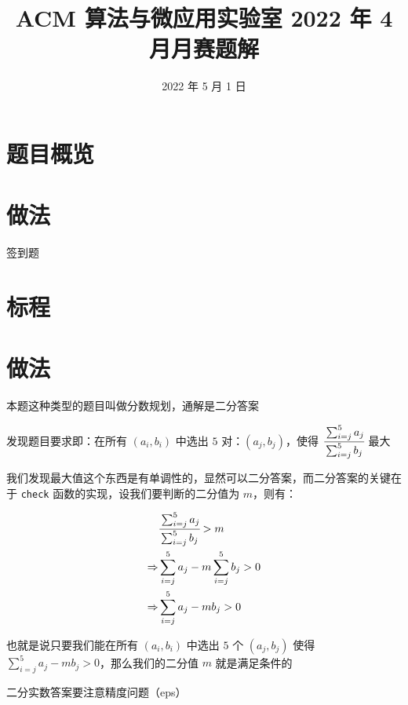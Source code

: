 \documentclass{ctsol}
\title{ACM 算法与微应用实验室 2022 年 4 月月赛题解}
\date{2022 年 5 月 1 日}
\begin{document}
\maketitle
{}

\section*{题目概览}

\solutiontab

\makesolution
\section*{做法}

签到题

\section*{标程}


\makesolution
\section*{做法}

本题这种类型的题目叫做分数规划，通解是二分答案

发现题目要求即：在所有 $(a_i,b_i)$ 中选出 $5$ 对：$(a_j,b_j)$，使得 $\cfrac{\sum_{i=j}^{5}a_j}{\sum_{i=j}^{5}b_j}$ 最大

我们发现最大值这个东西是有单调性的，显然可以二分答案，而二分答案的关键在于 \verb|check| 函数的实现，设我们要判断的二分值为 $m$，则有：

$$
    \begin{aligned}
                    & \cfrac{\sum_{i=j}^{5}a_j}{\sum_{i=j}^{5}b_j} > m \\
        \Rightarrow & \sum_{i=j}^{5}a_j - m\sum_{i=j}^{5}b_j > 0 \\
        \Rightarrow & \sum_{i=j}^{5}a_j-mb_j > 0
    \end{aligned}
$$

也就是说只要我们能在所有 $(a_i,b_i)$ 中选出 $5$ 个 $(a_j,b_j)$ 使得 $\sum_{i=j}^{5}a_j-mb_j > 0$，那么我们的二分值 $m$ 就是满足条件的

二分实数答案要注意精度问题（eps）
\end{document}
